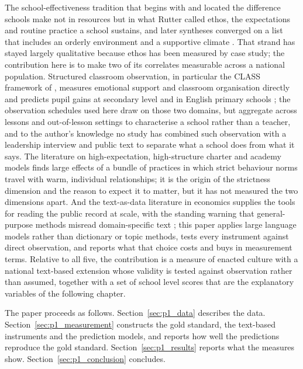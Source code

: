 The school-effectiveness tradition that begins with \citet{coleman1966} and
\citet{rutter1979} located the difference schools make not in resources but
in what Rutter called ethos, the expectations and routine practice a school
sustains, and later syntheses converged on a list that includes an orderly
environment and a supportive climate \citep{edmonds1979,sammons1995,teddlie2000}.
That strand has stayed largely qualitative because ethos has been measured
by case study; the contribution here is to make two of its correlates
measurable across a national population. Structured classroom observation,
in particular the CLASS framework of \citet{hamre2007}, measures emotional
support and classroom organisation directly and predicts pupil gains at
secondary level \citep{allen2013} and in English primary schools
\citep{sammons2008}; the observation schedules used here draw on those two
domains, but aggregate across lessons and out-of-lesson settings to
characterise a school rather than a teacher, and to the author's knowledge no
study has combined such observation with a leadership interview and public
text to separate what a school does from what it says. The literature on
high-expectation, high-structure charter and academy models
\citep{abdulkadiroglu2011,angrist2010,dobbie2013,fryer2014} finds large
effects of a bundle of practices in which strict behaviour norms travel with
warm, individual relationships; it is the origin of the strictness dimension
and the reason to expect it to matter, but it has not measured the two
dimensions apart. And the text-as-data literature in economics
\citep{gentzkow2019} supplies the tools for reading the public record at
scale, with the standing warning that general-purpose methods misread
domain-specific text \citep{loughran2011,muddiman2019}; this paper applies
large language models rather than dictionary or topic methods, tests every
instrument against direct observation, and reports what that choice costs and
buys in measurement terms. Relative to all five, the contribution is a measure
of enacted culture with a national text-based extension whose validity is
tested against observation rather than assumed, together with a set of school
level scores that are the explanatory variables of the following chapter.

The paper proceeds as follows. Section~\ref{sec:p1_data} describes the data.
Section~\ref{sec:p1_measurement} constructs the gold standard, the text-based
instruments and the prediction models, and reports how well the predictions
reproduce the gold standard. Section~\ref{sec:p1_results} reports what the
measures show. Section~\ref{sec:p1_conclusion} concludes.

